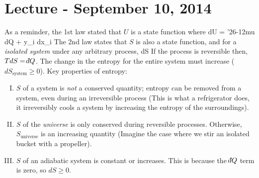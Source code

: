 \documentclass[12pt]{article}
\def\dbar{{\mathchar'26\mkern-12mu d}}
\begin{document}
\section{Lecture - September 10, 2014}
As a reminder, the 1st law stated that $U$ is a state function where
\beq
dU = \dbar Q + \sum y_i dx_i
\ceq
The 2nd law states that $S$ is also a state function, and for a \emph{isolated system} under any arbitrary process,
\beq dS \geq \frac{\dbar Q}{T} \ceq
If the process is reversible then, $TdS = \dbar Q$.  The change in the entropy for the entire system must increase ($dS_\text{system} \geq 0$).
Key properties of entropy:
\begin{enumerate}[(I)]
\item $S$ of a system is \emph{not} a conserved quantity; entropy can be removed from a system, even during an irreversible process (This is what a refrigerator does, it irreversibly cools a system by increasing the entropy of the surroundings). 
\item $S$ of the \emph{universe} is only conserved during reversible processes. Otherwise, $S_\text{universe}$ is an increasing quantity (Imagine the case where we stir an isolated bucket with a propeller).
\item $S$ of an adiabatic system is constant or increases.  This is because the $\dbar Q$ term is zero, so $dS \geq 0$. %
\end{enumerate}
\end{document}
